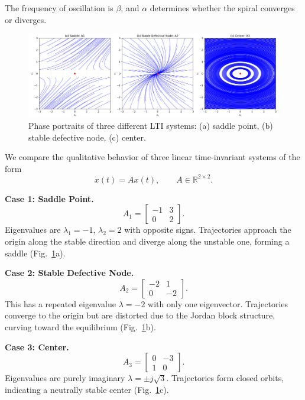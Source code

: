 The frequency of oscillation is $\beta$, and $\alpha$ determines whether the spiral converges or diverges.

\begin{example}
\begin{figure}[h!]
    \centering
    \includegraphics[width=\linewidth]{Images/nonlinear/introduction/phase_dense.png}
    \caption{Phase portraits of three different LTI systems: 
    (a) saddle point, 
    (b) stable defective node, 
    (c) center.}
    \label{fig:lti_phase}
\end{figure}

We compare the qualitative behavior of three linear time-invariant systems of the form
\[
\dot{x}(t) = A x(t), \qquad A \in \mathbb{R}^{2\times 2}.
\]

\textbf{Case 1: Saddle Point.}  
\[
A_1 = \begin{bmatrix} -1 & 3 \\ 0 & 2 \end{bmatrix}.
\]
Eigenvalues are $\lambda_1=-1$, $\lambda_2=2$ with opposite signs.  
Trajectories approach the origin along the stable direction and diverge along the unstable one, forming a saddle (Fig.~\ref{fig:lti_phase}a).

\textbf{Case 2: Stable Defective Node.}  
\[
A_2 = \begin{bmatrix} -2 & 1 \\ 0 & -2 \end{bmatrix}.
\]
This has a repeated eigenvalue $\lambda=-2$ with only one eigenvector.  
Trajectories converge to the origin but are distorted due to the Jordan block structure, curving toward the equilibrium (Fig.~\ref{fig:lti_phase}b).

\textbf{Case 3: Center.}  
\[
A_3 = \begin{bmatrix} 0 & -3 \\ 1 & 0 \end{bmatrix}.
\]
Eigenvalues are purely imaginary $\lambda = \pm j\sqrt{3}$.  
Trajectories form closed orbits, indicating a neutrally stable center (Fig.~\ref{fig:lti_phase}c).
\end{example}

